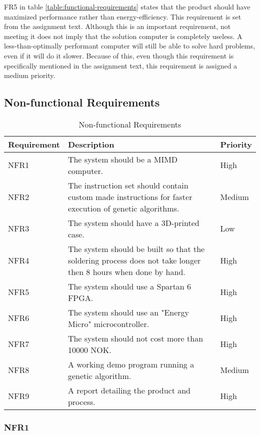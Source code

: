 FR5 in table \vref{table:functional-requirements} states that the product should have maximized performance rather than energy-efficiency.
This requirement is set from the assignment text.
Although this is an important requirement, not meeting it does not imply that the solution computer is completely useless.
A less-than-optimally performant computer will still be able to solve hard problems, even if it will do it slower.
Because of this, even though this requirement is specifically mentioned in the assignment text, this requirement is assigned a medium priority.

\subsection{Non-functional Requirements}

\begin{table}[H]
\begin{center}
\begin{tabular}{| l | p{7cm} | l |}
\hline
Requirement & Description & Priority \\
\hline
NFR1 & The system should be a MIMD computer. & High \\
NFR2 & The instruction set should contain custom made instructions for faster execution of genetic algorithms. & Medium \\
NFR3 & The system should have a 3D-printed case. & Low \\
NFR4 & The system should be built so that the soldering process does not take longer then 8 hours when done by hand. & High \\
NFR5 & The system should use a Spartan 6 FPGA. & High\\
NFR6 & The system should use an "Energy Micro" microcontroller. & High \\
NFR7 & The system should not cost more than 10000 NOK. & High \\
NFR8 & A working demo program running a genetic algorithm. & Medium \\
NFR9 & A report detailing the product and process. & High \\
\hline
\end{tabular}
\caption{Non-functional Requirements}
\label{table:non-functional-requirements}
\end{center}
\end{table}

\subsubsection{NFR1}

